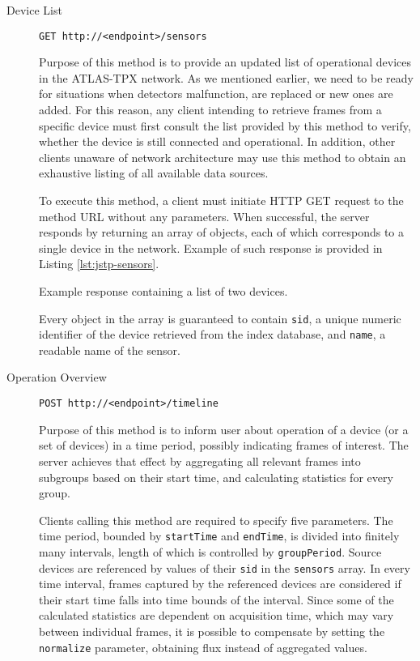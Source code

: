\begin{description}
	\item[Device List]
	\texttt{GET http://<endpoint>/sensors}

	Purpose of this method is to provide an updated list of operational devices in the ATLAS-TPX network. As we mentioned earlier, we need to be ready for situations when detectors malfunction, are replaced or new ones are added. For this reason, any client intending to retrieve frames from a specific device must first consult the list provided by this method to verify, whether the device is still connected and operational. In addition, other clients unaware of network architecture may use this method to obtain an exhaustive listing of all available data sources.

	To execute this method, a client must initiate HTTP GET request to the method URL without any parameters. When successful, the server responds by returning an array of objects, each of which corresponds to a single device in the network. Example of such response is provided in Listing \ref{lst:jstp-sensors}.

	\begin{listing}
	    \caption{Example response containing a list of two devices.}
	    \label{lst:jstp-sensors}
	\end{listing}

	Every object in the array is guaranteed to contain \texttt{sid}, a unique numeric identifier of the device retrieved from the index database, and \texttt{name}, a readable name of the sensor.

	\item[Operation Overview]
	\texttt{POST http://<endpoint>/timeline}

	Purpose of this method is to inform user about operation of a device (or a set of devices) in a time period, possibly indicating frames of interest. The server achieves that effect by aggregating all relevant frames into subgroups based on their start time, and calculating statistics for every group.

	Clients calling this method are required to specify five parameters. The time period, bounded by \texttt{startTime} and \texttt{endTime}, is divided into finitely many intervals, length of which is controlled by \texttt{groupPeriod}. Source devices are referenced by values of their \texttt{sid} in the \texttt{sensors} array. In every time interval, frames captured by the referenced devices are considered if their start time falls into time bounds of the interval. Since some of the calculated statistics are dependent on acquisition time, which may vary between individual frames, it is possible to compensate by setting the \texttt{normalize} parameter, obtaining flux instead of aggregated values.


\end{description}
